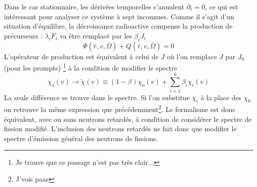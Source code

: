 
Dans le cas stationnaire, les dérivées temporelles s'annulent $\partial_t = 0$, ce qui est intéressant
pour analyser ce système à sept inconnues. Comme il s'agit d'un situation d'équilibre, la 
décroissance radioactive compense la production de précurseurs : $\lambda_i F_i$ va être 
remplacé par les $\beta_iJ_i$
\begin{equation}
[(1 - \beta ){J_o} - K + \sum\limits_{i = 1}^6    {\beta _i}{J_i}]\varPhi (\bar r,v,\bar \Omega ) + Q(\bar r,v,\bar \Omega ) = 0
\end{equation}
L'opérateur de production est équivalent à celui de $J$ où l'on remplace $J$ par $J_0$ (pour les 
prompts)
\footnote{Je trouve que ce passage n'est pas très clair...} à la condition de modifier le spectre
\begin{equation}
{\chi _o}(v) \to \tilde \chi (v) \equiv (1 - \beta ){\chi _o}(v) + \sum\limits_{i = 1}^6    {\beta _i}{\chi _i}(v)
\end{equation}
La seule différence se trouve dans le spectre. Si l'on substitue $\chi_i$ à la place des 
$\chi_0$ on retrouve la même expression que précédemment\footnote{J'vois paas}. Le formalisme est 
donc équivalent, avec ou sans neutrons retardés, à condition de considérer le spectre de fission 
modifié. L'inclusion des neutrons retardés ne fait donc que modifier le spectre d'émission 
général des neutrons de fissions.



